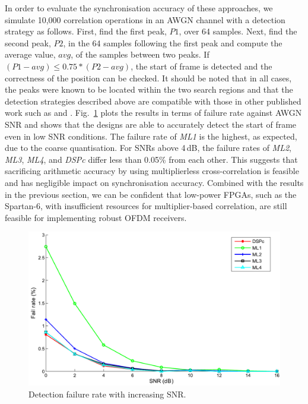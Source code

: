 In order to evaluate the synchronisation accuracy of these approaches, we simulate 10,000 correlation operations in an AWGN channel with a detection strategy as follows.
First, find the first peak, $P1$, over 64 samples.
Next, find the second peak, $P2$, in the 64 samples following the first peak and compute the average value, $avg$, of the samples between two peaks.
If  $( P1 - avg ) \le  0.75 * ( P2 - avg )$, the start of frame is detected and the correctness of the position can be checked.
It should be noted that in all cases, the peaks were known to be located within the two search regions and that the detection strategies described above are compatible with those in other published work such as \cite{Kishore2006} and \cite{Yip2003}.
Fig.~\ref{fig:Plot_NFail} plots the results in terms of failure rate against AWGN SNR and shows that the designs are able to accurately detect the start of frame even in low SNR conditions.
The failure rate of \emph{ML1} is the highest, as expected, due to the coarse quantisation.
For SNRs above 4\,dB, the failure rates of \emph{ML2}, \emph{ML3}, \emph{ML4}, and \emph{DSPc} differ less than 0.05\% from each other.
This suggests that sacrificing arithmetic accuracy by using multiplierless cross-correlation is feasible and has negligible impact on synchronisation accuracy.
Combined with the results in the previous section, we can be confident that low-power FPGAs, such as the Spartan-6, with insufficient resources for multiplier-based correlation, are still feasible for implementing robust OFDM receivers.

\begin{figure}
	\centerline{\includegraphics [width=0.9\columnwidth] {figures/Plot_NFail.pdf} }
	\caption{Detection failure rate with increasing SNR.}
	\label{fig:Plot_NFail}
\end{figure}

